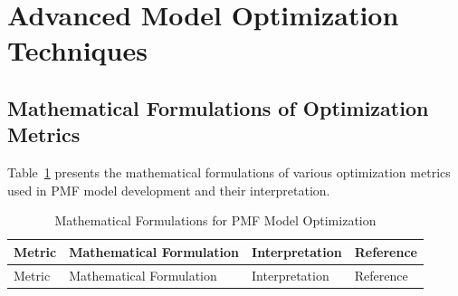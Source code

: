 \documentclass[
  letterpaper,
  oneside,
  openany]{MastersDoctoralThesis}
\theoremstyle{plain}
\theoremstyle{remark}
\begin{document}
\section{Advanced Model Optimization Techniques}\label{sec-ch2-advanced}

\subsection{Mathematical Formulations of Optimization
Metrics}\label{sec-ch2-math}

Table~\ref{tbl-ch2-optimization-metrics} presents the mathematical
formulations of various optimization metrics used in PMF model
development and their interpretation.

\begin{longtable}[]{@{}
  >{\raggedright\arraybackslash}p{}
  >{\raggedright\arraybackslash}p{}
  >{\raggedright\arraybackslash}p{}
  >{\raggedright\arraybackslash}p{}@{}}
\caption{Mathematical Formulations for PMF Model
Optimization}\label{tbl-ch2-optimization-metrics}\tabularnewline
\toprule\noalign{}
\begin{minipage}[b]{\linewidth}\raggedright
Metric
\end{minipage} & \begin{minipage}[b]{\linewidth}\raggedright
Mathematical Formulation
\end{minipage} & \begin{minipage}[b]{\linewidth}\raggedright
Interpretation
\end{minipage} & \begin{minipage}[b]{\linewidth}\raggedright
Reference
\end{minipage} \\
\midrule\noalign{}
\endfirsthead
\toprule\noalign{}
\begin{minipage}[b]{\linewidth}\raggedright
Metric
\end{minipage} & \begin{minipage}[b]{\linewidth}\raggedright
Mathematical Formulation
\end{minipage} & \begin{minipage}[b]{\linewidth}\raggedright
Interpretation
\end{minipage} & \begin{minipage}[b]{\linewidth}\raggedright
Reference
\end{minipage} \\

\end{longtable}
\end{document}
